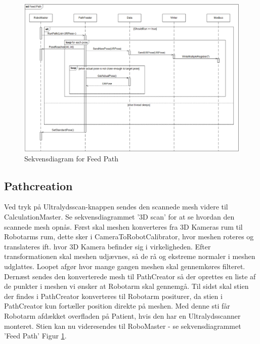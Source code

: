 \begin{figure}[H]
    \centering
    \includegraphics[width=1\textwidth] {figurer/d/Design/Sequence/sd_feedpath}
    \caption{Sekvensdiagram for Feed Path}
    \label{sd_feedpath}
\end{figure}

\subsection{Pathcreation}
Ved tryk på Ultralydsscan-knappen sendes den scannede mesh videre til CalculationMaster. Se sekvensdiagrammet '3D scan' for at se hvordan den scannede mesh opnås.
Først skal meshen konverteres fra 3D Kameras rum til Robotarms rum, dette sker i CameraToRobotCalibrator, hvor meshen roteres og translateres ift. hvor 3D Kamera befinder sig i virkeligheden.
Efter transformationen skal meshen udjævnes, så de rå og ekstreme normaler i meshen udglattes. Loopet afgør hvor mange gangen meshen skal gennemkøres filteret.
Dernæst sendes den konverterede mesh til PathCreator så der oprettes en liste af de punkter i meshen vi ønsker at Robotarm skal gennemgå.
Til sidst skal stien der findes i PathCreator konverteres til Robotarm positurer, da stien i PathCreator kun fortæller position direkte på meshen.
Med denne sti får Robotarm afdækket overfladen på Patient, hvis den har en Ultralydsscanner monteret.
Stien kan nu videresendes til RoboMaster - se sekvensdiagrammet 'Feed Path' Figur \ref{sd_feedpath}.

